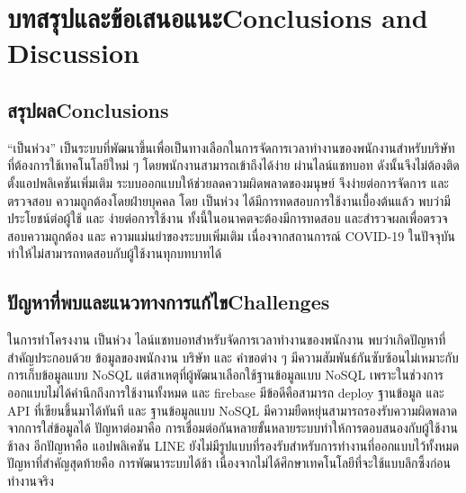 \chapter{\ifcpe บทสรุปและข้อเสนอแนะ\else Conclusions and Discussion\fi}

\section{\ifcpe สรุปผล\else Conclusions\fi}
\quad “เป็นห่วง” เป็นระบบที่พัฒนาขึ้นเพื่อเป็นทางเลือกในการจัดการเวลาทํางานของพนักงานสําหรับบริษัทที่ต้องการใช้เทคโนโลยีใหม่ ๆ โดยพนักงานสามารถเข้าถึงได้ง่าย ผ่านไลน์แชทบอท 
ดังนั้นจึงไม่ต้องติดตั้งแอปพลิเคชันเพิ่มเติม ระบบออกแบบให้ช่วยลดความผิดพลาดของมนุษย์ จึงง่ายต่อการจัดการ และ ตรวจสอบ ความถูกต้องโดยฝ่ายบุคคล
โดย เป็นห่วง ได้มีการทดสอบการใช้งานเบื้องต้นแล้ว พบว่ามีประโยชน์ต่อผู้ใช้ และ ง่ายต่อการใช้งาน ทั้งนี้ในอนาคตจะต้องมีการทดสอบ 
และสํารวจผลเพื่อตรวจสอบความถูกต้อง และ ความแม่นยําของระบบเพิ่มเติม เนื่องจากสถานการณ์ COVID-19 ในปัจจุบันทําให้ไม่สามารถทดสอบกับผู้ใช้งานทุกบทบาทได้

\section{\ifcpe ปัญหาที่พบและแนวทางการแก้ไข\else Challenges\fi}

ในการทำโครงงาน เป็นห่วง ไลน์แชทบอทสำหรับจัดการเวลาทำงานของพนักงาน พบว่าเกิดปัญหาที่สำคัญประกอบด้วย 
ข้อมูลของพนักงาน บริษัท และ คำขอต่าง ๆ มีความสัมพันธ์กันซับซ้อนไม่เหมาะกับการเก็บข้อมูลแบบ NoSQL 
แต่สาเหตุที่ผู้พัฒนาเลือกใช้ฐานข้อมูลแบบ NoSQL เพราะในช่วงการออกแบบไม่ได้คำนึกถึงการใช้งานทั้งหมด และ firebase 
มีข้อดีคือสามารถ deploy ฐานข้อมูล และ API ที่เขียนขึ้นมาได้ทันที และ ฐานข้อมูลแบบ NoSQL มีความยืดหยุ่นสามารถรองรับความผิดพลาดจากการใส่ข้อมูลได้ 
ปัญหาต่อมาคือ การเชื่อมต่อกันหลายขั้นหลายระบบทำให้การตอบสนองกับผู้ใช้งานช้าลง 
อีกปัญหาคือ แอปพลิเคชัน LINE ยังไม่มีรูปแบบที่รองรับสำหรับการทำงานที่ออกแบบไว้ทั้งหมด 
ปัญหาที่สำคัญสุดท้ายคือ การพัฒนาระบบได้ช้า เนื่องจากไม่ได้ศึกษาเทคโนโลยีที่จะใช้แบบลึกซึ้งก่อนทำงานจริง

